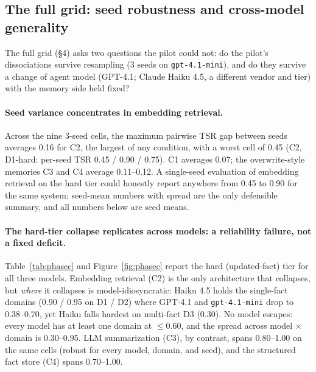 \documentclass[11pt]{article}
\begin{document}
\subsection{The full grid: seed robustness and cross-model generality}
\label{sec:phasec}

The full grid (\S4) asks two questions the pilot could not: do the pilot's
dissociations survive resampling (3 seeds on \texttt{gpt-4.1-mini}), and do
they survive a change of agent model (GPT-4.1; Claude Haiku 4.5, a
different vendor and tier) with the memory side held fixed?

\paragraph{Seed variance concentrates in embedding retrieval.} Across the
nine 3-seed cells, the maximum pairwise TSR gap between seeds averages
0.16 for C2, the largest of any condition, with a worst cell of 0.45
(C2, D1-hard: per-seed TSR 0.45 / 0.90 / 0.75). C1 averages 0.07; the
overwrite-style memories C3 and C4 average 0.11--0.12. A single-seed
evaluation of embedding retrieval on the hard tier could honestly report
anywhere from 0.45 to 0.90 for the same system; seed-mean numbers with
spread are the only defensible summary, and all numbers below are seed
means.

\paragraph{The hard-tier collapse replicates across models: a
reliability failure, not a fixed deficit.} Table~\ref{tab:phasec} and
Figure~\ref{fig:phasec} report the hard (updated-fact) tier for all three
models. Embedding retrieval (C2) is the only architecture that collapses,
but \emph{where} it collapses is model-idiosyncratic: Haiku 4.5 holds the
single-fact domains (0.90 / 0.95 on D1 / D2) where GPT-4.1 and
\texttt{gpt-4.1-mini} drop to 0.38--0.70, yet Haiku falls hardest on
multi-fact D3 (0.30). No model escapes: every model has at least one
domain at ${\le}0.60$, and the spread across model $\times$ domain is
0.30--0.95. LLM summarization (C3), by contrast, spans 0.80--1.00 on the
same cells (robust for every model, domain, and seed), and the
structured fact store (C4) spans 0.70--1.00.
\end{document}
